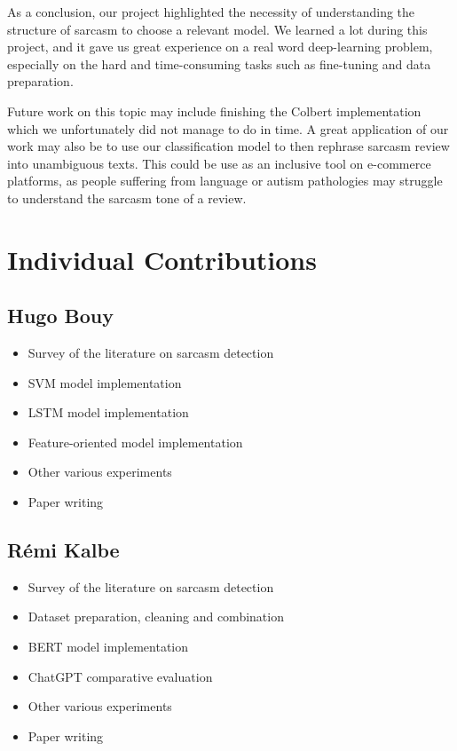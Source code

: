 \documentclass[10pt,twocolumn,letterpaper]{article}
\begin{document}
As a conclusion, our project highlighted the necessity of understanding the structure of sarcasm to choose a relevant model.
We learned a lot during this project, and it gave us great experience on a real word deep-learning problem, especially on the hard and time-consuming tasks such as fine-tuning and data preparation.

Future work on this topic may include finishing the Colbert implementation which we unfortunately did not manage to do in time.
A great application of our work may also be to use our classification model to then rephrase sarcasm review into unambiguous texts.
This could be use as an inclusive tool on e-commerce platforms, as people suffering from language or autism pathologies may struggle to understand the sarcasm tone of a review.

\section{Individual Contributions}

\subsection{Hugo Bouy}
\begin{itemize}
    \item Survey of the literature on sarcasm detection
    \item SVM model implementation
    \item LSTM model implementation
    \item Feature-oriented model implementation
    \item Other various experiments
    \item Paper writing
\end{itemize}

\subsection{Rémi Kalbe}
\begin{itemize}
    \item Survey of the literature on sarcasm detection
    \item Dataset preparation, cleaning and combination
    \item BERT model implementation
    \item ChatGPT comparative evaluation
    \item Other various experiments
    \item Paper writing
\end{itemize}
\end{document}
